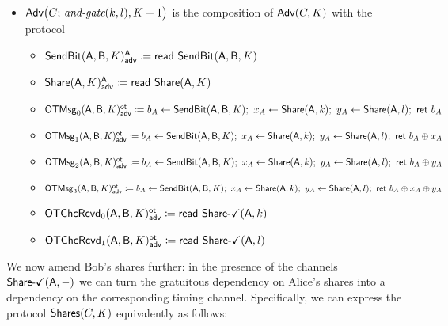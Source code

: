 \begin{itemize}
\item $\mathsf{Adv}\big(C; \, \textit{and-gate}(k,l),K+1\big)$ is the composition of $\mathsf{Adv}(C,K)$ with the protocol
\begin{itemize}
\item {\color{blue} $\mathsf{SendBit}(\mathsf{A},\mathsf{B},K)^{\mathsf{A}}_{\mathsf{adv}} \coloneqq \mathsf{read} \ \mathsf{SendBit}(\mathsf{A},\mathsf{B},K)$}
\item {\color{blue} $\mathsf{Share}(\mathsf{A},K)^{\mathsf{A}}_{\mathsf{adv}} \coloneqq \mathsf{read} \ \mathsf{Share}(\mathsf{A},K)$}\smallskip
\item {\color{blue} $\LeakOTMsg_0(\A,\B,K)^\ot_\adv \coloneqq b_A \leftarrow \SendBit(\A,\B,K); \ x_A \leftarrow \Share(\A,k); \ y_A \leftarrow \Share(\A,l); \ \ret{b_A}$}
\item {\color{blue} $\mathsf{OTMsg}_1(\mathsf{A},\mathsf{B},K)^{\mathsf{ot}}_{\mathsf{adv}} \coloneqq b_A \leftarrow \mathsf{SendBit}(\mathsf{A},\mathsf{B},K); \ x_A \leftarrow \mathsf{Share}(\mathsf{A},k); \ y_A \leftarrow \mathsf{Share}(\mathsf{A},l); \ \mathsf{ret} \ b_A \oplus x_A$}
\item {\color{blue} $\mathsf{OTMsg}_2(\mathsf{A},\mathsf{B},K)^{\mathsf{ot}}_{\mathsf{adv}} \coloneqq b_A \leftarrow \mathsf{SendBit}(\mathsf{A},\mathsf{B},K); \ x_A \leftarrow \mathsf{Share}(\mathsf{A},k); \ y_A \leftarrow \mathsf{Share}(\mathsf{A},l); \ \mathsf{ret} \ b_A \oplus y_A$}
\item {\color{blue} $\mathsf{OTMsg}_3(\mathsf{A},\mathsf{B},K)^{\mathsf{ot}}_{\mathsf{adv}} \coloneqq b_A \leftarrow \mathsf{SendBit}(\mathsf{A},\mathsf{B},K); \ x_A \leftarrow \mathsf{Share}(\mathsf{A},k); \ y_A \leftarrow \mathsf{Share}(\mathsf{A},l); \ \mathsf{ret} \ b_A \oplus x_A \oplus y_A$}\smallskip
\item {\color{blue} $\mathsf{OTChcRcvd}_0(\mathsf{A},\mathsf{B},K)^{\mathsf{ot}}_{\mathsf{adv}} \coloneqq \mathsf{read} \ \mathsf{Share}\textsf{-}\checkmark(\mathsf{A},k)$}
\item {\color{blue} $\mathsf{OTChcRcvd}_1(\mathsf{A},\mathsf{B},K)^{\mathsf{ot}}_{\mathsf{adv}} \coloneqq \mathsf{read} \ \mathsf{Share}\textsf{-}\checkmark(\mathsf{A},l)$}
\end{itemize}
\end{itemize}

We now amend Bob's shares further: in the presence of the channels $\mathsf{Share}\textsf{-}\checkmark(\mathsf{A},-)$ we can turn the gratuitous dependency on Alice's shares into a dependency on the corresponding timing channel. Specifically, we can express the protocol $\mathsf{Shares}(C,K)$ equivalently as follows:

